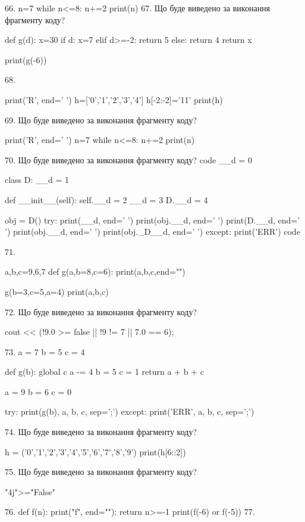 \documentclass[11pt]{article}
\begin{document}
66. 
n=7
   while n<=8: n+=2
   print(n)
67. Що буде виведено за виконання фрагменту коду?

def g(d):
    x=30
    if d: 
        x=7
    elif d>=-2:
         return 5
    else:
         return 4
    return x

print(g(-6))

68. 

print('R', end=' ')
h=['0','1','2','3','4']
h[-2:-2]='11'
print(h)


69. Що буде виведено за виконання фрагменту коду?

print('R', end=' ')
n=7
while n<=8:
    n+=2
print(n)


70. Що буде виведено за виконання фрагменту коду?
code
__d = 0

class D:
    __d = 1
    
    def __init__(self):
        self.__d = 2
        __d = 3
        D.__d = 4

obj = D()
try:
    print(__d, end=' ')
    print(obj.__d, end=' ')
    print(D.__d, end=' ')
    print(obj.__d, end=' ')
    print(obj._D__d, end=' ')
except:
    print('ERR')
code

71. 

a,b,c=9,6,7
def g(a,b=8,c=6):
    print(a,b,c,end="")

g(b=3,c=5,a=4)
print(a,b,c)


72. Що буде виведено за виконання фрагменту коду?

cout << (!9.0 >= false || !9 != 7 || 7.0 == 6);

73. 
a = 7
b = 5
c = 4

def g(b):
global c    a -= 4
    b = 5
    c = 1
    return a + b + c

a = 9
b = 6
c = 0

try:
    print(g(b), a, b, c, sep=';')
except:
    print('ERR', a, b, c, sep=';')

74. Що буде виведено за виконання фрагменту коду?

h = ('0','1','2','3','4','5','6','7','8','9')
print(h[6::2])


75. Що буде виведено за виконання фрагменту коду?

"4j">="False"

76. 
def f(n): print("f", end=""); return n>=-1
   print(f(-6) or f(-5))
77. 
\end{document}
